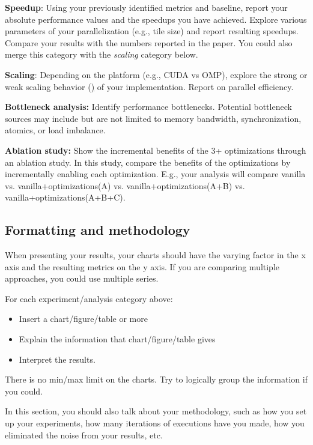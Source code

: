 \documentclass[sigconf,authorversion,nonacm]{acmart}
\begin{document}
\textbf{Speedup}: Using your previously identified metrics and baseline, report your absolute performance values and the speedups you have achieved. Explore various parameters of your parallelization (e.g., tile size) and report resulting speedups. Compare your results with the numbers reported in the paper.
You could also merge this category with the \textit{scaling} category below.


\textbf{Scaling}: Depending on the platform (e.g., CUDA vs OMP), explore the strong or weak scaling behavior (\href{https://hpc-wiki.info/hpc/Scaling}) of your implementation. Report on parallel efficiency.

\textbf{Bottleneck analysis:} Identify performance bottlenecks. Potential bottleneck sources may include but are not limited to memory bandwidth, synchronization, atomics, or load imbalance.

\textbf{Ablation study:} Show the incremental benefits of the 3+ optimizations through an ablation study. In this study, compare the benefits of the optimizations by incrementally enabling each optimization. E.g., your analysis will compare vanilla vs. vanilla+optimizations(A) vs. vanilla+optimizations(A+B) vs. vanilla+optimizations(A+B+C).

\subsection{Formatting and methodology}

When presenting your results, your charts should have the varying factor in the x axis and the resulting metrics on the y axis. If you are comparing multiple approaches, you could use multiple series. 

For each experiment/analysis category above:
\begin{itemize}
    \item Insert a chart/figure/table or more
    \item Explain the information that chart/figure/table gives
    \item Interpret the results. 
\end{itemize}

There is no min/max limit on the charts. Try to logically group the information if you could. 

In this section, you should also talk about your methodology, such as how  you set up your experiments, how many iterations of executions have you made, how you eliminated the noise from your results, etc. 
\end{document}
